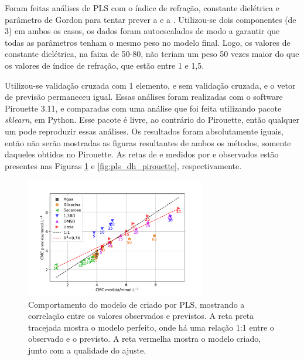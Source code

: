 		Foram feitas análises de PLS  com o índice de refração, constante dielétrica e parâmetro de Gordon para tentar prever a \cmc{} e a \DHmic. Utilizou-se dois componentes (de 3) em ambos os casos, os dados foram autoescalados de modo a garantir que todas as parâmetros tenham o mesmo peso no modelo final. Logo, os valores de constante dielétrica, na faixa de 50-80, não teriam um peso 50 vezes maior do que os valores de índice de refração, que estão entre 1 e 1,5. 
		
		Utilizou-se validação cruzada com 1 elemento, e sem validação cruzada, e o vetor de previsão permaneceu igual. Essas análises foram realizadas com o software Pirouette 3.11, e comparadas com uma análise que foi feita utilizando pacote \emph{sklearn}, em Python. Esse pacote é livre, ao contrário do Pirouette, então qualquer um pode reproduzir essas análises. Os resultados foram absolutamente iguais, então não serão mostradas as figuras resultantes de ambos os métodos, somente daqueles obtidos no Pirouette. As retas de \cmc{} e \DHmic{} medidos por \cmc{} e \DHmic{} observados estão presentes nas Figuras \ref{fig:pls_cmc_pirouette} e \ref{fig:pls_dh_pirouette}, respectivamente.
		
		\begin{figure}[h]
			\centering
			\includegraphics[width=0.7\textwidth]{imagens/itc/PLS_cmc_pirouette}
			\caption{Comportamento do modelo de \cmc{} criado por PLS, mostrando a correlação entre os valores observados e previstos. A reta preta tracejada mostra o modelo perfeito, onde há uma relação 1:1 entre o observado e o previsto. A reta vermelha mostra o modelo criado, junto com a qualidade do ajuste.}
			\label{fig:pls_cmc_pirouette}
		\end{figure}
	
